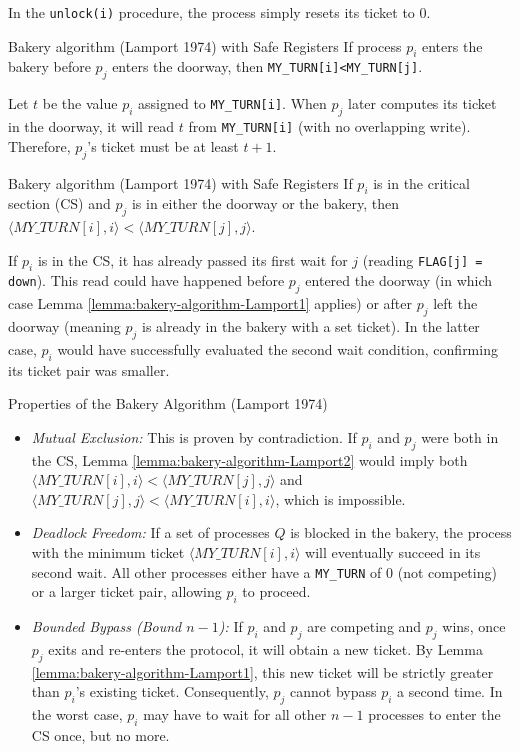 In the \texttt{unlock(i)} procedure, the process simply resets its ticket to 0.

\begin{Lemma}{Bakery algorithm (Lamport 1974) with Safe Registers}{}\label{lemma:bakery-algorithm-Lamport1}
If process $p_i$ enters the bakery before $p_j$ enters the doorway, then \texttt{MY\_TURN[i]<MY\_TURN[j]}.
\begin{demonstration}
Let $t$ be the value $p_i$ assigned to \texttt{MY\_TURN[i]}. When $p_j$ later computes its ticket in the doorway, it will read $t$ from \texttt{MY\_TURN[i]} (with no overlapping write). Therefore, $p_j$'s ticket must be at least $t+1$.
\end{demonstration}
\end{Lemma}
    
\begin{Lemma}{Bakery algorithm (Lamport 1974) with Safe Registers}{}\label{lemma:bakery-algorithm-Lamport2}
If $p_i$ is in the critical section (CS) and $p_j$ is in either the doorway or the bakery, then $\langle MY\_TURN[i],i\rangle < \langle MY\_TURN[j],j\rangle$.
\begin{demonstration}
If $p_i$ is in the CS, it has already passed its first wait for $j$ (reading \texttt{FLAG[j] = down}). This read could have happened before $p_j$ entered the doorway (in which case Lemma \ref{lemma:bakery-algorithm-Lamport1} applies) or after $p_j$ left the doorway (meaning $p_j$ is already in the bakery with a set ticket). In the latter case, $p_i$ would have successfully evaluated the second wait condition, confirming its ticket pair was smaller.
\end{demonstration}
\end{Lemma}

\begin{Demonstration}{Properties of the Bakery Algorithm (Lamport 1974)}{}
\begin{itemize}
    \item \textit{Mutual Exclusion:} This is proven by contradiction. If $p_i$ and $p_j$ were both in the CS, Lemma \ref{lemma:bakery-algorithm-Lamport2} would imply both $\langle MY\_TURN[i],i\rangle <\langle MY\_TURN[j],j\rangle$ and $\langle MY\_TURN[j],j\rangle <\langle MY\_TURN[i],i\rangle$, which is impossible.
    \item \textit{Deadlock Freedom:} If a set of processes $Q$ is blocked in the bakery, the process with the minimum ticket $\langle MY\_TURN[i],i\rangle$ will eventually succeed in its second wait. All other processes either have a \texttt{MY\_TURN} of 0 (not competing) or a larger ticket pair, allowing $p_i$ to proceed.
    \item \textit{Bounded Bypass (Bound $n-1$):} If $p_i$ and $p_j$ are competing and $p_j$ wins, once $p_j$ exits and re-enters the protocol, it will obtain a new ticket. By Lemma \ref{lemma:bakery-algorithm-Lamport1}, this new ticket will be strictly greater than $p_i$'s existing ticket. Consequently, $p_j$ cannot bypass $p_i$ a second time. In the worst case, $p_i$ may have to wait for all other $n-1$ processes to enter the CS once, but no more.
\end{itemize}
\end{Demonstration}

